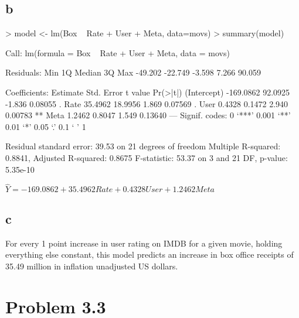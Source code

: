 \documentclass{article}
\begin{document}
\subsection*{b}
\begin{Schunk}
\begin{Sinput}
> model <- lm(Box ~ Rate + User + Meta, data=movs)
> summary(model)
\end{Sinput}
\begin{Soutput}
Call:
lm(formula = Box ~ Rate + User + Meta, data = movs)

Residuals:
    Min      1Q  Median      3Q     Max 
-49.202 -22.749  -3.598   7.266  90.059 

Coefficients:
             Estimate Std. Error t value Pr(>|t|)   
(Intercept) -169.0862    92.0925  -1.836  0.08055 . 
Rate          35.4962    18.9956   1.869  0.07569 . 
User           0.4328     0.1472   2.940  0.00783 **
Meta           1.2462     0.8047   1.549  0.13640   
---
Signif. codes:  0 ‘***’ 0.001 ‘**’ 0.01 ‘*’ 0.05 ‘.’ 0.1 ‘ ’ 1

Residual standard error: 39.53 on 21 degrees of freedom
Multiple R-squared:  0.8841,	Adjusted R-squared:  0.8675 
F-statistic: 53.37 on 3 and 21 DF,  p-value: 5.35e-10
\end{Soutput}
\end{Schunk}
$\hat{Y} = -169.0862+35.4962Rate+0.4328User+1.2462Meta$

\subsection*{c}
For every 1 point increase in user rating on IMDB for a given movie, holding everything else constant, this model predicts an increase in box office receipts of 35.49 million in inflation unadjusted US dollars. 

\section*{Problem 3.3}
\end{document}
